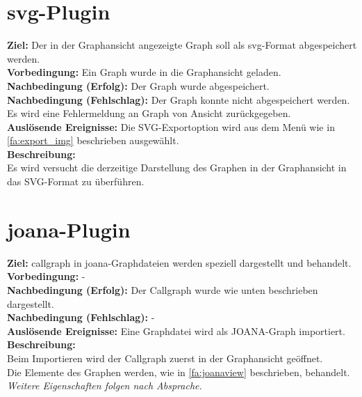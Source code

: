 \section{\gls{svg}-Plugin}
\setcounter{fanr}{400}

\label{fa:export_svg}
\textbf{Ziel:} Der in der Graphansicht angezeigte Graph soll als \gls{svg}-Format abgespeichert werden.\\
\textbf{Vorbedingung:} Ein Graph wurde in die Graphansicht geladen.\\
\textbf{Nachbedingung (Erfolg):} Der Graph wurde abgespeichert.\\
\textbf{Nachbedingung (Fehlschlag):} Der Graph konnte nicht abgespeichert werden. Es wird eine Fehlermeldung an Graph von Ansicht zurückgegeben.\\
\textbf{Auslösende Ereignisse:} Die SVG-Exportoption wird aus dem Menü wie in \ref{fa:export_img} beschrieben ausgewählt.\\
\textbf{Beschreibung:}\\
Es wird versucht die derzeitige Darstellung des Graphen in der Graphansicht in das SVG-Format zu überführen.

\section{\gls{joana}-Plugin}
\setcounter{fanr}{500}

\label{fa:callview}
\textbf{Ziel:} \gls{callgraph} in \gls{joana}-Graphdateien werden speziell dargestellt und behandelt.\\
\textbf{Vorbedingung:} -\\
\textbf{Nachbedingung (Erfolg):} Der Callgraph wurde wie unten beschrieben dargestellt.\\
\textbf{Nachbedingung (Fehlschlag):} -\\
\textbf{Auslösende Ereignisse:} Eine Graphdatei wird als JOANA-Graph importiert.\\
\textbf{Beschreibung:}\\
Beim Importieren wird der Callgraph zuerst in der Graphansicht geöffnet.\\
Die Elemente des Graphen werden, wie in \ref{fa:joanaview} beschrieben, behandelt.
\textit{Weitere Eigenschaften folgen nach Absprache.}

